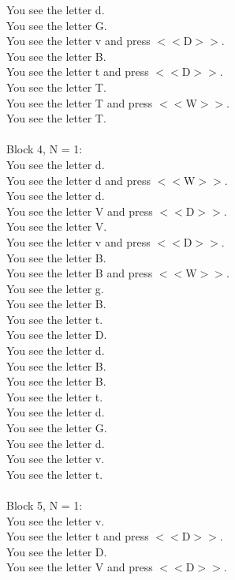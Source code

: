\documentclass[pdflatex,sn-nature]{sn-jnl}%
\theoremstyle{thmstyleone}%
\theoremstyle{thmstyletwo}%
\theoremstyle{thmstylethree}%
\begin{document}
You see the letter d. $~$\\ 
You see the letter G. $~$\\ 
You see the letter v and press $<<$D$>>$. $~$\\ 
You see the letter B. $~$\\ 
You see the letter t and press $<<$D$>>$. $~$\\ 
You see the letter T. $~$\\ 
You see the letter T and press $<<$W$>>$. $~$\\ 
You see the letter T. $~$\\ 
 $~$\\ 
Block 4, N = 1: $~$\\ 
You see the letter d. $~$\\ 
You see the letter d and press $<<$W$>>$. $~$\\ 
You see the letter d. $~$\\ 
You see the letter V and press $<<$D$>>$. $~$\\ 
You see the letter V. $~$\\ 
You see the letter v and press $<<$D$>>$. $~$\\ 
You see the letter B. $~$\\ 
You see the letter B and press $<<$W$>>$. $~$\\ 
You see the letter g. $~$\\ 
You see the letter B. $~$\\ 
You see the letter t. $~$\\ 
You see the letter D. $~$\\ 
You see the letter d. $~$\\ 
You see the letter B. $~$\\ 
You see the letter B. $~$\\ 
You see the letter t. $~$\\ 
You see the letter d. $~$\\ 
You see the letter G. $~$\\ 
You see the letter d. $~$\\ 
You see the letter v. $~$\\ 
You see the letter t. $~$\\ 
 $~$\\ 
Block 5, N = 1: $~$\\ 
You see the letter v. $~$\\ 
You see the letter t and press $<<$D$>>$. $~$\\ 
You see the letter D. $~$\\ 
You see the letter V and press $<<$D$>>$. $~$\\ 
\end{document}
